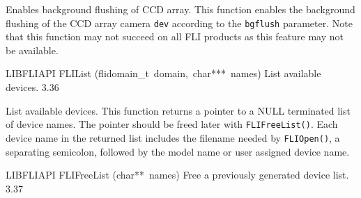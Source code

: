 \documentclass{article}
\begin{document}
\begin{cxxentry}
\begin{cxxfunction}
\begin{cxxdoc}
Enables background flushing of CCD array.  This function enables the
background flushing of the CCD array camera \texttt{dev} according to the
\texttt{bgflush} parameter. Note that this function may not succeed
on all FLI products as this feature may not be available.


\end{cxxdoc}
\end{cxxfunction}
\begin{cxxfunction}
{LIBFLIAPI}
        {FLIList}
        {(flidomain\_t\ domain,\ char***\ names)}
        { List available devices.}
        {3.36}
\begin{cxxdoc}

List available devices.  This function returns a pointer to a NULL
terminated list of device names.  The pointer should be freed later
with \texttt{FLIFreeList()}.  Each device name in the returned list
includes the filename needed by \texttt{FLIOpen()}, a separating
semicolon, followed by the model name or user assigned device name.


\end{cxxdoc}
\end{cxxfunction}
\begin{cxxfunction}
{LIBFLIAPI}
        {FLIFreeList}
        {(char**\ names)}
        { Free a previously generated device list.}
        {3.37}
\begin{cxxdoc}


\end{cxxdoc}
\end{cxxfunction}
\end{cxxentry}
\end{document}
